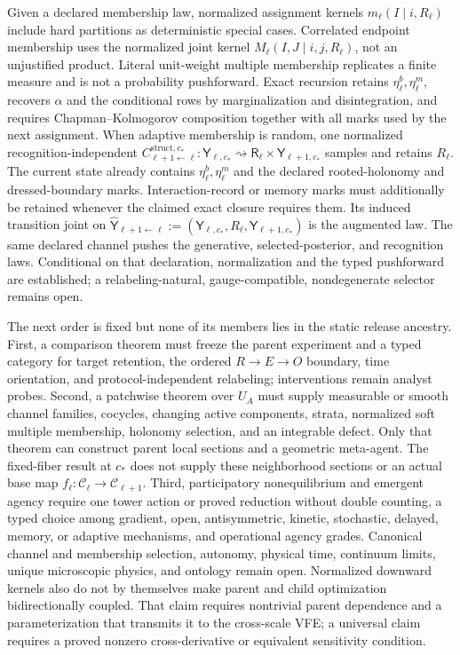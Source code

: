 \begin{description}
Given a declared membership law, normalized assignment kernels
\(m_\ell(I\mid i,R_\ell)\) include hard partitions as deterministic special
cases. Correlated endpoint membership uses the normalized joint kernel
\(M_\ell(I,J\mid i,j,R_\ell)\), not an unjustified product. Literal unit-weight
multiple membership replicates a finite measure and is not a probability
pushforward. Exact recursion retains \(\eta_\ell^b,\eta_\ell^m\), recovers
\(\alpha\) and the conditional rows by marginalization and disintegration, and
requires Chapman--Kolmogorov composition together with all marks used by the
next assignment. When adaptive membership is random, one normalized
recognition-independent
\(C^{\mathrm{struct},c_*}_{\ell+1\leftarrow\ell}:
\mathsf Y_{\ell,c_*}\rightsquigarrow
\mathsf R_\ell\times\mathsf Y_{\ell+1,c_*}\) samples and retains \(R_\ell\).
The current state already contains \(\eta_\ell^b,\eta_\ell^m\) and the declared
rooted-holonomy and dressed-boundary marks. Interaction-record or memory marks
must additionally be retained whenever the claimed exact closure requires
them. Its induced transition joint on
\(\widehat{\mathsf Y}_{\ell+1\leftarrow\ell}
:=(\mathsf Y_{\ell,c_*},R_\ell,\mathsf Y_{\ell+1,c_*})\) is the augmented law.
The same declared channel pushes the generative, selected-posterior, and
recognition laws. Conditional on that declaration, normalization and the typed
pushforward are established; a relabeling-natural, gauge-compatible,
nondegenerate selector remains open. 

\item[Downstream comparison, gluing, and agency (open).]
The next order is fixed but none of its members lies in the static release
ancestry. First, a comparison theorem must freeze the parent experiment and a
typed category for target retention, the ordered \(R\to E\to O\) boundary,
time orientation, and protocol-independent relabeling; interventions remain
analyst probes. Second, a patchwise theorem over \(U_A\) must supply
measurable or smooth channel families, cocycles, changing active components,
strata, normalized soft multiple membership, holonomy selection, and an
integrable defect. Only that theorem can construct parent local sections and a
geometric meta-agent. The fixed-fiber result at \(c_*\) does not supply these
neighborhood sections or an actual base map
\(f_\ell:\mathcal C_\ell\to\mathcal C_{\ell+1}\). Third, participatory
nonequilibrium and emergent agency
require one tower action or proved reduction without double counting, a typed
choice among gradient, open, antisymmetric, kinetic, stochastic, delayed,
memory, or adaptive mechanisms, and operational agency grades. Canonical
channel and membership selection, autonomy, physical time, continuum limits,
unique microscopic physics, and ontology remain open. Normalized downward
kernels also do not by themselves make parent and child optimization
bidirectionally coupled. That claim requires nontrivial parent dependence and a
parameterization that transmits it to the cross-scale VFE; a universal claim
requires a proved nonzero cross-derivative or equivalent sensitivity condition.


\end{description}
